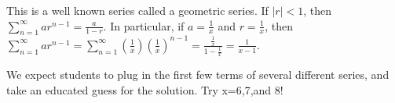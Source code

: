 




This is a well known series called a geometric series. If $| r | < 1$, then $\sum_{n=1}^{\infty} ar^{n-1}=\frac{a}{1-r}$. In particular, if $a=\frac{1}{x}$ and $r=\frac{1}{x}$, then $\sum_{n=1}^{\infty} ar^{n-1}=\sum_{n=1}^{\infty} (\frac{1}{x})(\frac{1}{x})^{n-1}=\frac{\frac{1}{x}}{1-\frac{1}{x}}=\frac{1}{x-1}$.

We expect students to plug in the first few terms of several different series, and take an educated guess for the solution. Try x=6,7,and 8!



